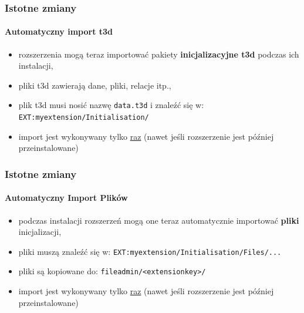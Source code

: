 
\begin{frame}[fragile]
	\frametitle{Istotne zmiany}
	\framesubtitle{Automatyczny import t3d}

	\begin{itemize}
		\item rozszerzenia mogą teraz importować pakiety \textbf{inicjalizacyjne t3d} podczas ich instalacji, 
		\item pliki t3d zawierają dane, pliki, relacje itp.,
		\item plik t3d musi nosić nazwę \texttt{data.t3d} i znaleźć się w:\newline
			\texttt{EXT:myextension/Initialisation/}

		\item import jest wykonywany tylko \underline{raz}\newline
			(nawet jeśli rozszerzenie jest później przeinstalowane)

	\end{itemize}

\end{frame}


\begin{frame}[fragile]
	\frametitle{Istotne zmiany}
	\framesubtitle{Automatyczny Import Plików}

	\begin{itemize}
		\item podczas instalacji rozszerzeń mogą one teraz automatycznie importować \textbf{pliki} inicjalizacji,
		\item pliki muszą znaleźć się w:\newline
			\texttt{EXT:myextension/Initialisation/Files/...}
		\item pliki są kopiowane do:\newline
			\texttt{fileadmin/<extensionkey>/}
		\item import jest wykonywany tylko \underline{raz}\newline
			(nawet jeśli rozszerzenie jest później przeinstalowane)

	\end{itemize}

\end{frame}

